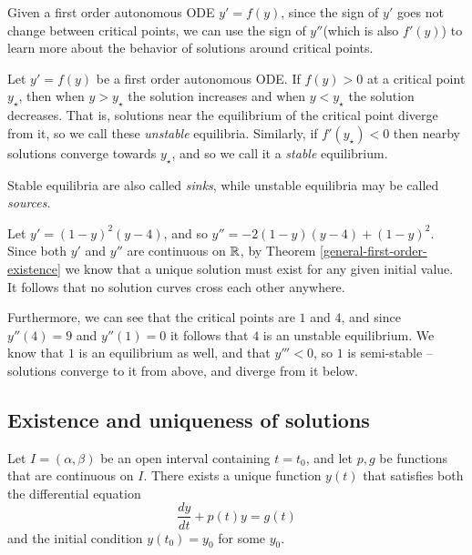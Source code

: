 \begin{rmk}
    Given a first order autonomous ODE $y' = f(y)$, since the sign of $y'$ goes not change between critical points, we can use the sign of $y''$(which is also $f'(y)$) to learn more about the behavior of solutions around critical points.
\end{rmk}

\begin{defn}
    Let $y' = f(y)$ be a first order autonomous ODE. If $f(y) > 0$ at a critical point $y_{\star}$, then when $y > y_{\star}$ the solution increases and when $y < y_{\star}$ the solution decreases. That is, solutions near the equilibrium of the critical point diverge from it, so we call these \emph{unstable} equilibria. Similarly, if $f'(y_{\star}) < 0$ then nearby solutions converge towards $y_{\star}$, and so we call it a \emph{stable} equilibrium.
\end{defn}

\begin{rmk}
    Stable equilibria are also called \emph{sinks}, while unstable equilibria may be called \emph{sources}.
\end{rmk}

\begin{exmp}
    Let $y' = (1-y)^2(y-4)$, and so $y'' = -2(1-y)(y-4) + (1-y)^2$. Since both $y'$ and $y''$ are continuous on $\mathbb{R}$, by Theorem \ref{general-first-order-existence} we know that a unique solution must exist for any given initial value. It follows that no solution curves cross each other anywhere.

    Furthermore, we can see that the critical points are $1$ and $4$, and since $y''(4) = 9$ and $y''(1) = 0$ it follows that $4$ is an unstable equilibrium. We know that $1$ is an equilibrium as well, and that $y''' < 0$, so $1$ is semi-stable -- solutions converge to it from above, and diverge from it below.
\end{exmp}

\subsection{Existence and uniqueness of solutions}

\begin{thm}\label{linear-first-order-existence}
    Let $I = (\alpha, \beta)$ be an open interval containing $t = t_0$, and let $p, g$ be functions that are continuous on $I$. There exists a unique function $y(t)$ that satisfies both the differential equation
    \[\frac{dy}{dt} + p(t)y = g(t)\] and the initial condition $y(t_0) = y_0$ for some $y_0$.
\end{thm}

